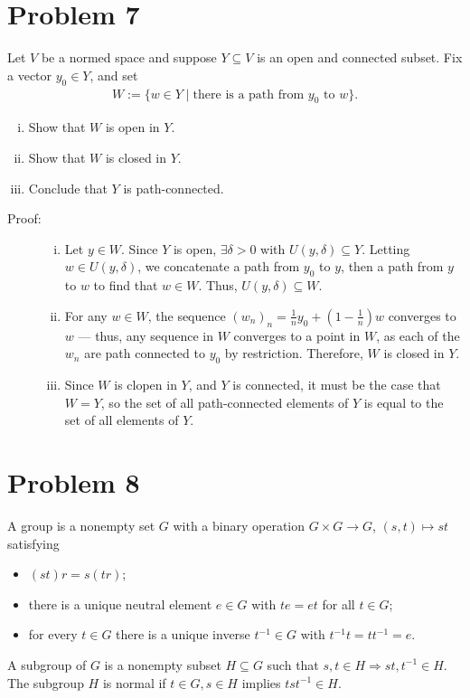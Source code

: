 \documentclass[8pt]{extarticle}
\begin{document}
  \section{Problem 7}%
  Let $V$ be a normed space and suppose $Y\subseteq V$ is an open and connected subset. Fix a vector $y_0\in Y$, and set
  \begin{align*}
    W := \{w\in Y\mid \text{there is a path from $y_0$ to $w$}\}.
  \end{align*}
  \begin{enumerate}[(i)]
    \item Show that $W$ is open in $Y$.
    \item Show that $W$ is closed in $Y$.
    \item Conclude that $Y$ is path-connected.
  \end{enumerate}
  \begin{description}
    \item[Proof:]\hfill
      \begin{enumerate}[(i)]
        \item Let $y\in W$. Since $Y$ is open, $\exists \delta > 0$ with $U(y,\delta)\subseteq Y$. Letting $w\in U(y,\delta)$, we concatenate a path from $y_0$ to $y$, then a path from $y$ to $w$ to find that $w\in W$. Thus, $U(y,\delta)\subseteq W$.
        \item For any $w\in W$, the sequence $\displaystyle(w_n)_n = \frac{1}{n}y_0 + \left(1-\frac{1}{n}\right)w$ converges to $w$ --- thus, any sequence in $W$ converges to a point in $W$, as each of the $w_n$ are path connected to $y_0$ by restriction. Therefore, $W$ is closed in $Y$.
        \item Since $W$ is clopen in $Y$, and $Y$ is connected, it must be the case that $W = Y$, so the set of all path-connected elements of $Y$ is equal to the set of all elements of $Y$.
      \end{enumerate}
  \end{description}
  \section{Problem 8}%
  A group is a nonempty set $G$ with a binary operation $G\times G \rightarrow G$, $(s,t)\mapsto st$ satisfying
  \begin{itemize}
    \item $(st)r = s(tr)$;
    \item there is a unique neutral element $e\in G$ with $te = et$ for all $t\in G$;
    \item for every $t\in G$ there is a unique inverse $t^{-1}\in G$ with $t^{-1}t = tt^{-1} = e$.
  \end{itemize}
  A subgroup of $G$ is a nonempty subset $H\subseteq G$ such that $s,t\in H \Rightarrow st,t^{-1}\in H$. The subgroup $H$ is normal if $t\in G,s\in H$ implies $tst^{-1}\in H$.\\
\end{document}
